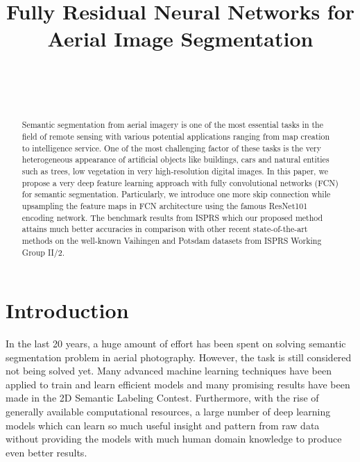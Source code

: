 \documentclass[conference]{IEEEtran}
\begin{document}
%
\title{Fully Residual Neural Networks for Aerial Image Segmentation}

\author{
\\
\and
{}
\\
}


\maketitle


\begin{abstract}
Semantic segmentation from aerial imagery is one of the most essential tasks in
the field of remote sensing with various potential applications ranging from map
creation to intelligence service.
One of the most challenging factor of these tasks is the very heterogeneous
appearance of artificial objects like buildings, cars and natural entities such
as trees, low vegetation in very high-resolution digital images. In this paper,
we propose a very deep feature learning approach with fully convolutional
networks (FCN) for semantic segmentation. Particularly, we introduce one more
skip connection while upsampling the feature maps in FCN architecture using the
famous ResNet101 encoding network. The benchmark results from ISPRS 
which our proposed method attains much better accuracies in comparison with
other recent state-of-the-art methods on the well-known Vaihingen and Potsdam
datasets from ISPRS Working Group II/2.

\end{abstract}


\section{Introduction}
In the last 20 years, a huge amount of effort has been spent on solving semantic
segmentation problem in aerial photography. However, the task is still
considered not being solved yet. Many advanced machine learning techniques have
been applied to train and learn efficient models and many promising results have
been made in the 2D Semantic Labeling Contest. Furthermore, with the rise of
generally available computational resources, a large number of deep learning
models which can learn so much useful insight and pattern from raw data without
providing the models with much human domain knowledge to produce even better
results.
\end{document}
